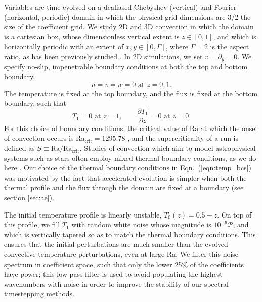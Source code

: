 \documentclass[aps, pre, onecolumn, nofootinbib, notitlepage, groupedaddress, amsfonts, amssymb, amsmath, longbibliography]{revtex4-1}
\begin{document}
Variables are time-evolved on a dealiased Chebyshev (vertical)
and Fourier (horizontal, periodic) domain in which the
physical grid dimensions are 3/2 the size of the coefficient grid.  
We study 2D and 3D convection in which the domain is a cartesian box, 
whose dimensionless vertical extent is $z \in [0, 1]$, 
and which is horizontally periodic with an extent of $x, y \in [0, \Gamma]$,
where $\Gamma = 2$ is the aspect ratio, as has been previously studied
\cite{goluskin&all2014, johnston&doering2009}. 
In 2D simulations, we set $v = \partial_y = 0$.
We specify no-slip, impenetrable boundary conditions at both the top and
bottom boundary,
\begin{equation}
u = v = w = 0 \, \, \text{at}\,\,z = 0,1.
\label{eqn:vel_bcs}
\end{equation}
The temperature is fixed at the top boundary, and the flux is fixed at the
bottom boundary, such that
\begin{equation}
T_1 = 0 \,\,\text{at}\,\, z=1, \qquad
\frac{\partial T_1}{\partial z} = 0\,\,\text{at}\,\,z=0.
\label{eqn:temp_bcs}
\end{equation}
For this choice of boundary conditions, the critical value of Ra at which
the onset of convection occurs is Ra$_{\text{crit}} = 1295.78$ \cite{goluskin2016}, and the
supercriticality of a run is defined as $S \equiv \text{Ra}/\text{Ra}_{\text{crit}}$.
Studies of convection which aim to model
astrophysical systems such as stars often employ mixed thermal
boundary conditions, as we do here \cite{hurlburt&all1984, cattaneo&all1991, korre&all2017}.
Our choice of the thermal boundary conditions in Eqn.~(\ref{eqn:temp_bcs}) 
was motivated by the fact that accelerated evolution is simpler when both the
thermal profile and the flux through the domain are fixed at a boundary 
(see section \ref{sec:ae}).

The initial temperature profile is linearly unstable,
$T_0(z) = 0.5 - z$. On top of this profile, we fill $T_1$ with
random white noise whose magnitude is $10^{-6}\mathcal{P}$, and which is
vertically tapered so as to match the thermal boundary conditions.
This ensures that the initial perturbations are much smaller than the
evolved convective temperature perturbations, even at large Ra.
We filter this noise spectrum in coefficient space, 
such that only the lower 25\% of the coefficients
have power; this low-pass filter is used to avoid populating the
highest wavenumbers with noise in order to improve the stability of our
spectral timestepping methods.
\end{document}
